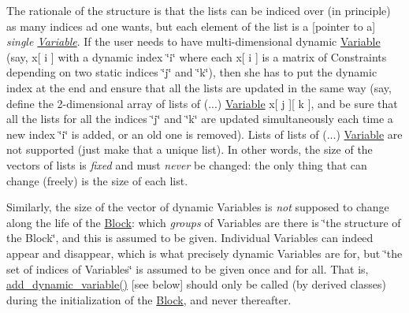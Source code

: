 The rationale of the structure is that the lists can be indiced over (in principle) as many indices ad one wants, but each element of the list is a \mbox{[}pointer to a\mbox{]} {\itshape single \mbox{\hyperlink{class_s_m_spp__di__unipi__it_1_1_variable}{Variable}}}. If the user needs to have multi-\/dimensional dynamic \mbox{\hyperlink{class_s_m_spp__di__unipi__it_1_1_variable}{Variable}} (say, x\mbox{[} i \mbox{]} with a dynamic index \char`\"{}i\char`\"{} where each x\mbox{[} i \mbox{]} is a matrix of Constraints depending on two static indices \char`\"{}j\char`\"{} and \char`\"{}k\char`\"{}), then she has to put the dynamic index at the end and ensure that all the lists are updated in the same way (say, define the 2-\/dimensional array of lists of (...) \mbox{\hyperlink{class_s_m_spp__di__unipi__it_1_1_variable}{Variable}} x\mbox{[} j \mbox{]}\mbox{[} k \mbox{]}, and be sure that all the lists for all the indices \char`\"{}j\char`\"{} and \char`\"{}k\char`\"{} are updated simultaneously each time a new index \char`\"{}i\char`\"{} is added, or an old one is removed). Lists of lists of (...) \mbox{\hyperlink{class_s_m_spp__di__unipi__it_1_1_variable}{Variable}} are not supported (just make that a unique list). In other words, the size of the vectors of lists is {\itshape fixed} and must {\itshape never} be changed\+: the only thing that can change (freely) is the size of each list.

Similarly, the size of the vector of dynamic Variables is {\itshape not} supposed to change along the life of the \mbox{\hyperlink{class_s_m_spp__di__unipi__it_1_1_block}{Block}}\+: which {\itshape groups} of Variables are there is \char`\"{}the structure of the Block\char`\"{}, and this is assumed to be given. Individual Variables can indeed appear and disappear, which is what precisely dynamic Variables are for, but \char`\"{}the set of indices of
    Variables\char`\"{} is assumed to be given once and for all. That is, \mbox{\hyperlink{class_s_m_spp__di__unipi__it_1_1_block_af7677194bbf8a194cf2105e72a1be2e7}{add\+\_\+dynamic\+\_\+variable()}} \mbox{[}see below\mbox{]} should only be called (by derived classes) during the initialization of the \mbox{\hyperlink{class_s_m_spp__di__unipi__it_1_1_block}{Block}}, and never thereafter.


